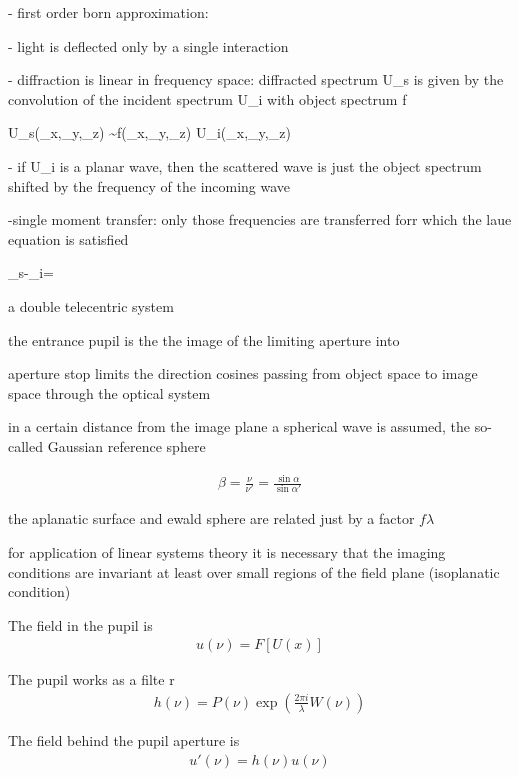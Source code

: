 - first order born approximation:

    - light is deflected only by a single interaction 

    - diffraction is linear in frequency space: diffracted spectrum U_s is
      given by the convolution of the incident spectrum U_i with object
      spectrum f

U_s(\nu_x,\nu_y,\nu_z) \sim f(\nu_x,\nu_y,\nu_z) \otimes U_i(\nu_x,\nu_y,\nu_z)

    - if U_i is a planar wave, then the scattered wave is just the
      object spectrum shifted by the frequency of the incoming wave

    -single moment transfer: only those frequencies \vec\gamma are
     transferred forr which the laue equation is satisfied

\nu_s-\nu_i=\vec\gamma





a double telecentric system



the entrance pupil is the the image of the limiting aperture into 

aperture stop limits the direction cosines passing from object space
to image space through the optical system

in a certain distance from the image plane a spherical wave is assumed,
the so-called Gaussian reference sphere


\begin{align}
  \beta = \frac{\nu}{\nu'}=\frac{\sin\alpha}{\sin\alpha'}
\end{align}

the aplanatic surface and ewald sphere are related just by a factor
$f\lambda$

for application of linear systems theory it is necessary that the
imaging conditions are invariant at least over small regions of the
field plane (isoplanatic condition)

The field in the pupil is
\begin{align}
u(\nu)=F\left[U(x)\right]
\end{align}

The pupil works as a filte
r\begin{align}
h(\nu)=P(\nu) \exp\left(\frac{2\pi i}{\lambda} W(\nu)\right)
\end{align}

The field behind the pupil aperture is
\begin{align}
u'(\nu)=h(\nu) u(\nu)
\end{align}

